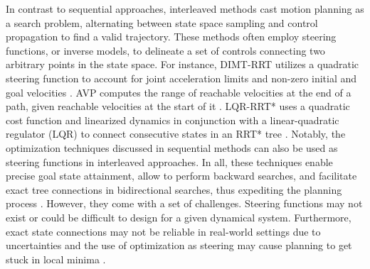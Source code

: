 In contrast to sequential approaches, interleaved methods cast motion planning as a search problem, alternating between state space sampling and control propagation to find a valid trajectory.
These methods often employ steering functions, or inverse models, to delineate a set of controls connecting two arbitrary points in the state space. 
For instance, DIMT-RRT utilizes a quadratic steering function to account for joint acceleration limits and non-zero initial and goal velocities \cite{kunz2014probabilistically}.
AVP computes the range of reachable velocities at the end of a path, given reachable velocities at the start of it \cite{pham2013kinodynamic,johnson2012optimal}.
LQR-RRT* uses a quadratic cost function and linearized dynamics in conjunction with a linear-quadratic regulator (LQR) to connect consecutive states in an RRT* tree \cite{perez2012lqr,caldwell2018fast}.
Notably, the optimization techniques discussed in sequential methods can also be used as steering functions in interleaved approaches.
In all, these techniques enable precise goal state attainment, allow to perform backward searches, and facilitate exact tree connections in bidirectional searches, thus expediting the planning process \cite{lavalle2006planning}.
However, they come with a set of challenges. Steering functions may not exist or could be difficult to design for a given dynamical system. Furthermore, exact state connections may not be reliable in real-world settings due to uncertainties and the use of optimization as steering may cause planning to get stuck in local minima \cite{littlefield2020efficient}.
